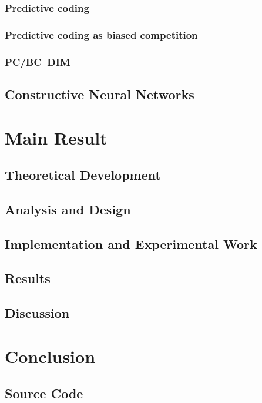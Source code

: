 \documentclass[11pt,a4paper]{report}
\begin{document}
			\subsection{Predictive coding}
			\subsection{Predictive coding as biased competition}
			\subsection{PC/BC--DIM}
			
		\section{Constructive Neural Networks}
		\label{sec:constructive}

	
	\chapter{Main Result}
		\section{Theoretical Development}
		\section{Analysis and Design}
		\section{Implementation and Experimental Work}
		\section{Results}
		\section{Discussion}
		
	\chapter{Conclusion}
	
	
	
	\nocite{*}
	
	\begin{appendices}
		\chapter{Source Code}
	\end{appendices}
\end{document}
